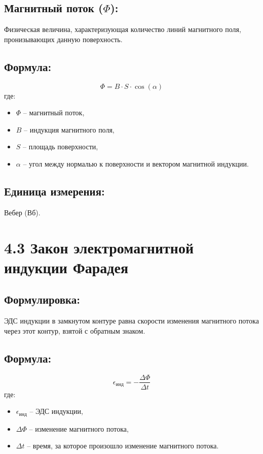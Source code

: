 \documentclass[a4paper,12pt]{article}
\begin{document}
\subsection*{Магнитный поток ($\Phi$):}
\vspace{-3pt}
Физическая величина, характеризующая количество линий магнитного поля, пронизывающих данную поверхность.

\vspace{-9pt}
\subsection*{Формула:}
\vspace{-3pt}
\vspace{-0.05em}
$$ \Phi = B \cdot S \cdot \cos(\alpha) $$
где:
\begin{itemize}
    \item $\Phi$ – магнитный поток,
    \item $B$ – индукция магнитного поля,
    \item $S$ – площадь поверхности,
    \item $\alpha$ – угол между нормалью к поверхности и вектором магнитной индукции.
\end{itemize}

\vspace{-9pt}
\subsection*{Единица измерения:}
\vspace{-3pt}
Вебер (Вб).

\section*{4.3 Закон электромагнитной индукции Фарадея}
\vspace{-9pt}
\subsection*{Формулировка:}
\vspace{-3pt}
ЭДС индукции в замкнутом контуре равна скорости изменения магнитного потока через этот контур, взятой с обратным знаком.

\vspace{-9pt}
\subsection*{Формула:}
\vspace{-3pt}
\vspace{-0.05em}
$$ \epsilon_{инд} = -\frac{\Delta \Phi}{\Delta t} $$
где:
\begin{itemize}
    \item $\epsilon_{инд}$ – ЭДС индукции,
    \item $\Delta \Phi$ – изменение магнитного потока,
    \item $\Delta t$ – время, за которое произошло изменение магнитного потока.
\end{itemize}
\end{document}
